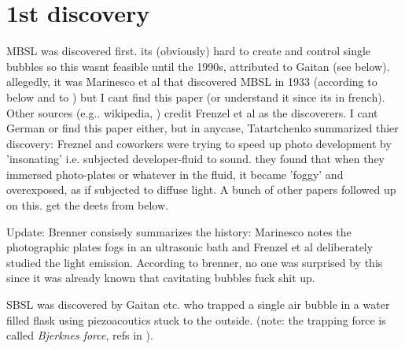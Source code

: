 \documentclass[rmp,aps,nofootinbib,superscriptaddress,floatfix]{revtex4-2}
\begin{document}
\section{1st discovery}
MBSL was discovered first. its (obviously) hard to create and control single bubbles so this wasnt feasible until the 1990s, attributed to Gaitan (see below). allegedly, it was Marinesco et al \cite{marinesco1933actions} that discovered MBSL in 1933 (according to \cite{gaitan1990experimental} below and to \cite{tatartchenko2017sonoluminescence}) but I cant find this paper (or understand it since its in french). Other sources (e.g.. wikipedia, \cite{tatartchenko2017sonoluminescence,crum1994sonoluminescence}) credit Frenzel et al \cite{frenzel1934luminescenz} as the discoverers. I cant German or find this paper either, but in anycase, Tatartchenko summarized thier discovery: Freznel and coworkers were trying to speed up photo development by 'insonating' i.e. subjected developer-fluid to sound. they found that when they immersed photo-plates or whatever in the fluid, it became 'foggy' and overexposed, as if subjected to diffuse light. A bunch of other papers followed up on this. get the deets from \cite{gaitan1990experimental} below. 

Update: Brenner \cite{brenner2002single} consisely summarizes the history: Marinesco notes the photographic plates fogs in an ultrasonic bath \cite{marinesco1933actions} and Frenzel et al \cite{frenzel1934luminescenz} deliberately studied the light emission. According to brenner, no one was surprised by this since it was already known that cavitating bubbles fuck shit up.

SBSL was discovered by Gaitan \cite{gaitan1990experimental,gaitan1992sonoluminescence} etc. who trapped a single air bubble in a water filled flask using piezoacoutics stuck to the outside. (note: the trapping force is called \emph{Bjerknes force}, refs in \cite{lohse2018bubble}).
\end{document}
